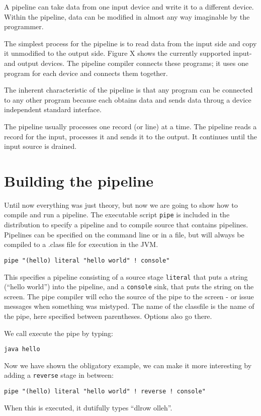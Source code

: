 A pipeline can take data from one input device and write it to a
different device. Within the pipeline, data can be modified in almost
any way imaginable by the programmer.

The simplest process for the pipeline is to read data from the input
side and copy it unmodified to the output side. Figure X shows the
currently supported input- and output devices. The pipeline compiler
connects these programs; it uses one program for each device and
connects them together.

The inherent characteristic of the pipeline is that any program can be
connected to any other program because each obtains data and sends
data throug a device independent standard interface.

The pipeline usually processes one record (or line) at a time. The
pipeline reads a record for the input, processes it and sends it to
the output. It continues until the input source is drained.

\section{Building the pipeline}
Until now everything was just theory, but now we are going to show how
to compile and run a pipeline. The executable script \texttt{pipe} is
included in the \nr{} distribution to specify a pipeline and to compile
\nr{} source that contains pipelines. Pipelines can be specified on
the command line or in a file, but will always be compiled to a .class
file for execution in the JVM.
\begin{shaded}
\begin{verbatim}
pipe "(hello) literal "hello world" ! console"
\end{verbatim}
\end{shaded}
This specifies a pipeline consisting of a source stage
\texttt{literal} that puts a string (``hello world'') into the pipeline, and
a \texttt{console} sink, that puts the string on the screen. The pipe
compiler will echo the source of the pipe to the screen - or issue
messages when something was mistyped. The name of the classfile is the
name of the pipe, here specified between parentheses. Options also go there.

We call execute the pipe by typing:
\begin{verbatim}
java hello
\end{verbatim}
Now we
have shown the obligatory example, we can make it more interesting by
adding a \texttt{reverse} stage in between:
\begin{shaded}
\begin{verbatim}
pipe "(hello) literal "hello world" ! reverse ! console"
\end{verbatim}
\end{shaded}
When this is executed, it dutifully types ``dlrow olleh''.

